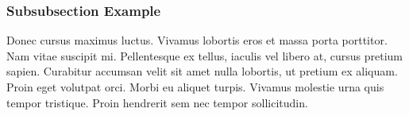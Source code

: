 \documentclass[
	a4paper, %
	10pt, %
	twoside, %
]{LTJournalArticle}
\begin{document}
\subsubsection{Subsubsection Example} 

Donec cursus maximus luctus. Vivamus lobortis eros et massa porta porttitor. Nam vitae suscipit mi. Pellentesque ex tellus, iaculis vel libero at, cursus pretium sapien. Curabitur accumsan velit sit amet nulla lobortis, ut pretium ex aliquam. Proin eget volutpat orci. Morbi eu aliquet turpis. Vivamus molestie urna quis tempor tristique. Proin hendrerit sem nec tempor sollicitudin.


\printbibliography %

\end{document}
